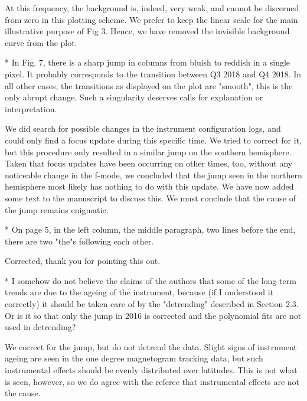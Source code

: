 \documentclass[12pt, letterpaper]{article}
\newcommand{\blue}{\color{blue}}
\begin{document}
\medskip \noindent At this frequency, the background is, indeed, very weak, and cannot be discerned from zero in this plotting scheme. We prefer to keep the linear scale for the main illustrative purpose of Fig 3. Hence, we have removed the invisible background curve from the plot.  \medskip

{\blue * In Fig. 7, there is a sharp jump in columns from bluish to reddish in a single pixel. It probably corresponds to the transition between Q3 2018 and Q4 2018. In all other cases, the transitions as displayed on the plot are "smooth", this is the only abrupt change. Such a singularity deserves calls for explanation or interpretation.}

\medskip \noindent We did search for possible changes in the instrument configuration logs, and could only find a focus update during this specific time. We tried to correct for it, but this procedure only resulted in a similar jump on the southern hemisphere. Taken that focus updates have been occurring on other times, too, without any noticeable change in the f-mode, we concluded that the jump seen in the northern hemisphere most likely has nothing to do with this update. We have now added some text to the manuscript to discuss this. We must conclude that the cause of the jump remains enigmatic. \medskip

{\blue * On page 5, in the left column, the middle paragraph, two lines before the end, there are two "the"s following each other.}

\medskip \noindent Corrected, thank you for pointing this out. \medskip

{\blue * I somehow do not believe the claims of the authors that some of the long-term trends are due to the ageing of the instrument, because (if I understood it correctly) it should be taken care of by the "detrending" described in Section 2.3. Or is it so that only the jump in 2016 is corrected and the polynomial fits are not used in detrending?}

\medskip \noindent We correct for the jump, but do not detrend the data. Slight signs of instrument ageing are seen in the one degree magnetogram tracking data, but such instrumental effects should be evenly distributed over latitudes. This is not what is seen, however, so we do agree with the referee that instrumental effects are not the cause.
\end{document}
